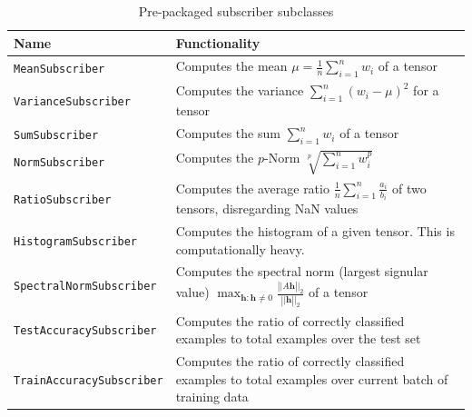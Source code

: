\begin{table}
    \centering
    \caption{Pre-packaged subscriber subclasses}
    \label{tbl:subscribers}
    \begin{tabularx}{\textwidth}{lX}
        \toprule
        Name                             & Functionality                                                                                                                                                         \tabularnewline
        \midrule
        \texttt{MeanSubscriber}          & Computes the mean $\mu = \frac{1}{n}\sum_{i=1}^n w_i$ of a tensor                                                                                                     \tabularnewline
        \texttt{VarianceSubscriber}      & Computes the variance $\sum_{i=1}^n (w_i - \mu)^2$ for a tensor                                                                                                       \tabularnewline
        \texttt{SumSubscriber}           & Computes the sum $\sum_{i=1}^n w_i$ of a tensor                                                                                                                       \tabularnewline
        \texttt{NormSubscriber}          & Computes the $p$-Norm $\sqrt[p]{\sum_{i=1}^n w_i^p}$                                                                                                                  \tabularnewline
        \texttt{RatioSubscriber}         & Computes the average ratio $\frac{1}{n}\sum_{i=1}^n \frac{a_i}{b_i}$ of two tensors, disregarding NaN values                                                          \tabularnewline
        \texttt{HistogramSubscriber}     & Computes the histogram of a given tensor. This is computationally heavy.                                                                                              \tabularnewline
        \texttt{SpectralNormSubscriber}  & Computes the spectral norm (largest signular value) $\max_{\mathbf{h}:\mathbf{h}\neq 0} \frac{\left||A\mathbf{h}\right||_2}{\left||\mathbf{h}\right||_2}$ of a tensor \tabularnewline
        \texttt{TestAccuracySubscriber}  & Computes the ratio of correctly classified examples to total examples over the test set                                                                               \tabularnewline
        \texttt{TrainAccuracySubscriber} & Computes the ratio of correctly classified examples to total examples over current batch of training data                                                             \tabularnewline
        \bottomrule
    \end{tabularx}
\end{table}

